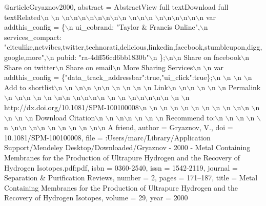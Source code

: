 @article{Gryaznov2000,
abstract = {AbstractView full textDownload full textRelated$\backslash$n $\backslash$n $\backslash$n$\backslash$n$\backslash$n$\backslash$n$\backslash$n$\backslash$n$\backslash$n$\backslash$n $\backslash$n$\backslash$n$\backslash$n $\backslash$n$\backslash$n$\backslash$n$\backslash$n$\backslash$n$\backslash$n var addthis{\_}config = {\{}$\backslash$n ui{\_}cobrand: "Taylor {\&} Francis Online",$\backslash$n services{\_}compact: "citeulike,netvibes,twitter,technorati,delicious,linkedin,facebook,stumbleupon,digg,google,more",$\backslash$n pubid: "ra-4dff56cd6bb1830b"$\backslash$n {\}};$\backslash$n$\backslash$n Share on facebook$\backslash$n Share on twitter$\backslash$n Share on email$\backslash$n More Sharing Services$\backslash$n $\backslash$n var addthis{\_}config = {\{}"data{\_}track{\_}addressbar":true,"ui{\_}click":true{\}};$\backslash$n $\backslash$n $\backslash$n $\backslash$n Add to shortlist$\backslash$n $\backslash$n $\backslash$n$\backslash$n $\backslash$n$\backslash$n $\backslash$n $\backslash$n $\backslash$n $\backslash$n Link$\backslash$n $\backslash$n$\backslash$n $\backslash$n $\backslash$n $\backslash$n Permalink$\backslash$n $\backslash$n$\backslash$n $\backslash$n $\backslash$n $\backslash$n$\backslash$n $\backslash$n$\backslash$n$\backslash$n$\backslash$n $\backslash$n $\backslash$n $\backslash$n$\backslash$n$\backslash$n$\backslash$n$\backslash$n $\backslash$n $\backslash$n http://dx.doi.org/10.1081/SPM-100100008$\backslash$n $\backslash$n $\backslash$n $\backslash$n $\backslash$n $\backslash$n $\backslash$n $\backslash$n $\backslash$n $\backslash$n$\backslash$n $\backslash$n $\backslash$n $\backslash$n $\backslash$n Download Citation$\backslash$n $\backslash$n $\backslash$n$\backslash$n $\backslash$n $\backslash$n $\backslash$n Recommend to:$\backslash$n $\backslash$n $\backslash$n $\backslash$n $\backslash$n $\backslash$n$\backslash$n $\backslash$n$\backslash$n $\backslash$n $\backslash$n $\backslash$n $\backslash$n $\backslash$n$\backslash$n A friend},
author = {Gryaznov, V.},
doi = {10.1081/SPM-100100008},
file = {:Users/marc/Library/Application Support/Mendeley Desktop/Downloaded/Gryaznov - 2000 - Metal Containing Membranes for the Production of Ultrapure Hydrogen and the Recovery of Hydrogen Isotopes.pdf:pdf},
isbn = {0360-2540},
issn = {1542-2119},
journal = {Separation {\&} Purification Reviews},
number = {2},
pages = {171--187},
title = {{Metal Containing Membranes for the Production of Ultrapure Hydrogen and the Recovery of Hydrogen Isotopes}},
volume = {29},
year = {2000}
}
